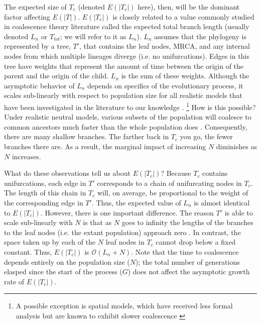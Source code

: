 The expected size of $T_c$ (denoted $E(|T_c|)$ here), then, will be the dominant factor affecting $E(|T|)$.
$E(|T_c|)$ is closely related to a value commonly studied in coalescence theory literature called the expected total branch length (usually denoted $L_n$ or $T_{tot}$; we will refer to it as $L_n$).
$L_n$ assumes that the phylogeny is represented by a tree, $T'$, that contains the leaf nodes, MRCA, and any internal nodes from which multiple lineages diverge (i.e. no unifurcations).
Edges in this tree have weights that represent the amount of time between the origin of the parent and the origin of the child.
$L_n$ is the sum of these weights.
Although the asymptotic behavior of $L_n$ depends on specifics of the evolutionary process, it scales sub-linearly with respect to population size for all realistic models that have been investigated in the literature to our knowledge \citep{gnedinLcoalescentsSurvey2014}.%
\footnote{A possible exception is spatial models, which have received less formal analysis but are known to exhibit slower coalescence \citep{berestyckiRecentProgressCoalescent2009}}
How is this possible?
Under realistic neutral models, various subsets of the population will coalesce to common ancestors much faster than the whole population does \citep{nordborgCoalescentTheory2019}.
Consequently, there are many shallow branches.
The farther back in $T_c$ you go, the fewer branches there are.
As a result, the marginal impact of increasing $N$ diminishes as $N$ increases.

What do these observations tell us about $E(|T_c|)$?
Because $T_c$ contains unifurcations, each edge in $T'$ corresponds to a chain of unifurcating nodes in $T_c$.
The length of this chain in $T_c$ will, on average, be proportional to the weight of the corresponding edge in $T'$.
Thus, the expected value of $L_n$ is almost identical to $E(|T_c|)$.
However, there is one important difference.
The reason $T'$ is able to scale sub-linearly with $N$ is that as $N$ goes to infinity the lengths of the branches to the leaf nodes (i.e. the extant population) approach zero \citep{nordborgCoalescentTheory2019, delmasAsymptoticResultsLength2008, drmotaAsymptoticResultsConcerning2007}.
In contrast, the space taken up by each of the $N$ leaf nodes in $T_c$ cannot drop below a fixed constant.
Thus, $E(|T_c|)$ is $\mathcal{O}(L_n + N)$.
Note that the time to coalescence depends entirely on the population size ($N$); the total number of generations elasped since the start of the process ($G$) does not affect the asymptotic growth rate of $E(|T_c|)$.

